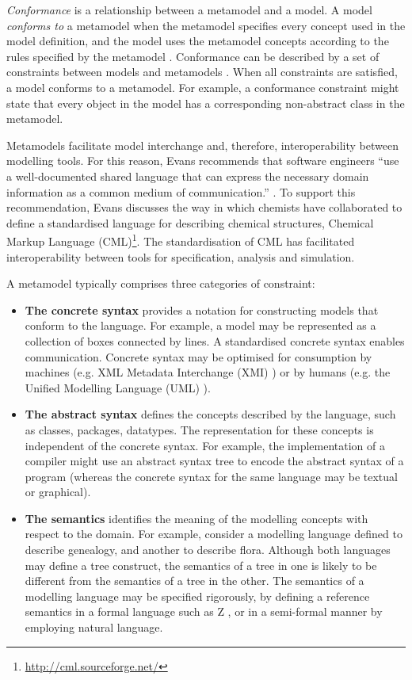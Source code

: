 \emph{Conformance} is a relationship between a metamodel and a model. A model \emph{conforms to} a metamodel when the metamodel specifies every concept used in the model definition, and the model uses the metamodel concepts according to the rules specified by the metamodel \cite{bezivin05unification}. Conformance can be described by a set of constraints between models and metamodels \cite{paige07metamodel}. When all constraints are satisfied, a model conforms to a metamodel. For example, a conformance constraint might state that every object in the model has a corresponding non-abstract class in the metamodel.

Metamodels facilitate model interchange and, therefore, interoperability between modelling tools.  For this reason, Evans recommends that software engineers ``use a well-documented shared language that can express the necessary domain information as a common medium of communication.'' \cite[pg377]{evans04domain}. To support this recommendation, Evans discusses the way in which chemists have collaborated to define a standardised language for describing chemical structures, Chemical Markup Language (CML)\footnote{\url{http://cml.sourceforge.net/}}. The standardisation of CML has facilitated interoperability between tools for specification, analysis and simulation.

A metamodel typically comprises three categories of constraint:

\begin{itemize}
	\item \textbf{The concrete syntax} provides a notation for constructing models that conform to the language. For example, a model may be represented as a collection of boxes connected by lines. A standardised concrete syntax enables communication. Concrete syntax may be optimised for consumption by machines (e.g. XML Metadata Interchange (XMI) \cite{xmi}) or by humans (e.g. the Unified Modelling Language (UML) \cite{uml212}).
	\item \textbf{The abstract syntax} defines the concepts described by the language, such as classes, packages, datatypes. The representation for these concepts is independent of the concrete syntax. For example, the implementation of a compiler might use an abstract syntax tree to encode the abstract syntax of a program (whereas the concrete syntax for the same language may be textual or graphical).
	\item \textbf{The semantics} identifies the meaning of the modelling concepts with respect to the domain. For example, consider a modelling language defined to describe genealogy, and another to describe flora. Although both languages may define a tree construct, the semantics of a tree in one is likely to be different from the semantics of a tree in the other. The semantics of a modelling language may be specified rigorously, by defining a reference semantics in a formal language such as Z \cite{z}, or in a semi-formal manner by employing natural language.
\end{itemize}


